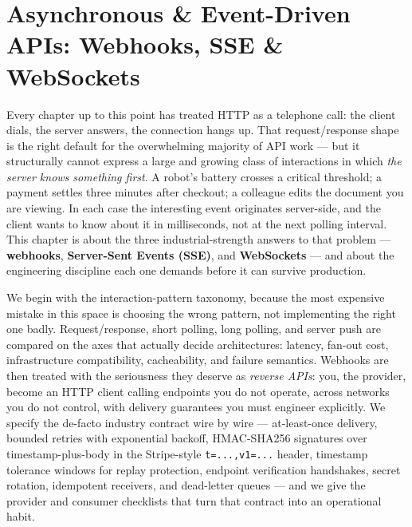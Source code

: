 \chapter{Asynchronous \& Event-Driven APIs: Webhooks, SSE \& WebSockets}
\label{ch:async_apis}

Every chapter up to this point has treated HTTP as a telephone call: the
client dials, the server answers, the connection hangs up. That
request/response shape is the right default for the overwhelming majority of
API work --- but it structurally cannot express a large and growing class of
interactions in which \emph{the server knows something first}. A robot's
battery crosses a critical threshold; a payment settles three minutes after
checkout; a colleague edits the document you are viewing. In each case the
interesting event originates server-side, and the client wants to know about
it in milliseconds, not at the next polling interval. This chapter is about
the three industrial-strength answers to that problem --- \textbf{webhooks},
\textbf{Server-Sent Events (SSE)}, and \textbf{WebSockets} --- and about the
engineering discipline each one demands before it can survive production.

We begin with the interaction-pattern taxonomy, because the most expensive
mistake in this space is choosing the wrong pattern, not implementing the
right one badly. Request/response, short polling, long polling, and server
push are compared on the axes that actually decide architectures: latency,
fan-out cost, infrastructure compatibility, cacheability, and failure
semantics. Webhooks are then treated with the seriousness they deserve as
\emph{reverse APIs}: you, the provider, become an HTTP client calling
endpoints you do not operate, across networks you do not control, with
delivery guarantees you must engineer explicitly. We specify the de-facto
industry contract wire by wire --- at-least-once delivery, bounded retries
with exponential backoff, HMAC-SHA256 signatures over timestamp-plus-body in
the Stripe-style \texttt{t=...,v1=...} header, timestamp tolerance windows
for replay protection, endpoint verification handshakes, secret rotation,
idempotent receivers, and dead-letter queues --- and we give the provider and
consumer checklists that turn that contract into an operational habit.


